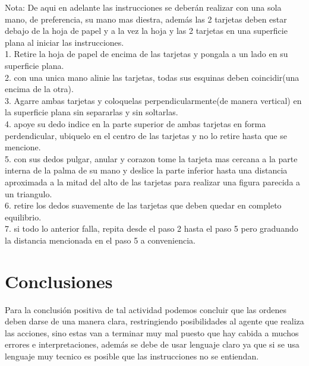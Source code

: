 \documentclass{article}
\begin{document}
Nota: De aqui en adelante las instrucciones se deberán realizar con una sola mano, de preferencia, su mano mas diestra, además las 2 tarjetas deben estar debajo de la hoja de papel y a la vez la hoja y las 2 tarjetas en una superficie plana al iniciar las instrucciones.\\
1.  Retire la hoja de papel de encima de las tarjetas y pongala a un lado en su superficie plana.\\
2.  con una unica mano alinie las tarjetas, todas sus esquinas deben coincidir(una encima de la otra).\\
3.  Agarre ambas tarjetas y coloquelas perpendicularmente(de manera vertical) en la superficie plana sin separarlas y sin soltarlas.\\
4.  apoye su dedo indice en la parte superior de ambas tarjetas en forma perdendicular, ubiquelo en el centro de las tarjetas y no lo retire hasta que se mencione.\\
5. con sus dedos pulgar, anular y corazon tome la tarjeta mas cercana a la parte interna de la palma de su mano y deslice la parte inferior hasta una distancia aproximada a la mitad del alto de las tarjetas para realizar una figura parecida a un triangulo.\\
6. retire los dedos suavemente de las tarjetas que deben quedar en completo equilibrio.\\
7.  si todo lo anterior falla, repita desde el paso 2 hasta el paso 5 pero graduando la distancia mencionada en el paso 5 a conveniencia.

\section{Conclusiones} \label{contenido}

        \vspace{0.4cm}

Para la conclusión positiva de tal actividad podemos concluir que las ordenes deben darse de una manera clara, restringiendo posibilidades al agente que realiza las acciones, sino estas van a terminar muy mal puesto que hay cabida a muchos errores e interpretaciones, además se debe de usar lenguaje claro ya que si se usa lenguaje muy tecnico es posible que las instrucciones no se entiendan.







\end{document}

